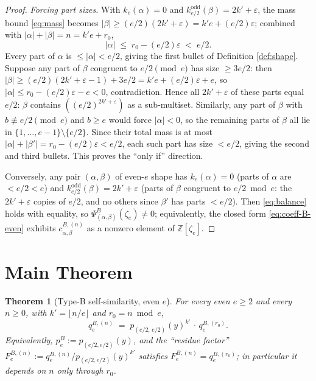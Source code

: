 \documentclass[11pt]{article}
\newtheorem{theorem}{Theorem}
\theoremstyle{definition}
\theoremstyle{remark}
\newcommand{\zetae}{\zeta_e}
\newcommand{\ZZ}{\mathbb{Z}}
\newcommand{\PsiB}{\Psi^{B}}
\newcommand{\peB}{p_e^{B}}
\newcommand{\eps}{\varepsilon}
\begin{document}
\begin{proof}
\emph{Forcing part sizes.} With $k_e(\alpha) = 0$ and $k_{e/2}^{\mathrm{odd}}(\beta) = 2k' + \eps$, the mass bound \eqref{eq:mass} becomes $|\beta| \ge (e/2)(2k' + \eps) = k'e + (e/2)\eps$; combined with $|\alpha| + |\beta| = n = k'e + r_0$,
\begin{equation}\label{eq:alpha-mass}
  |\alpha| \;\le\; r_0 - (e/2)\eps \;<\; e/2.
\end{equation}
Every part of $\alpha$ is $\le |\alpha| < e/2$, giving the first bullet of Definition \ref{def:shape}. Suppose any part of $\beta$ congruent to $e/2 \pmod e$ has size $\ge 3e/2$: then $|\beta| \ge (e/2)(2k' + \eps - 1) + 3e/2 = k'e + (e/2)\eps + e$, so $|\alpha| \le r_0 - (e/2)\eps - e < 0$, contradiction. Hence all $2k' + \eps$ of these parts equal $e/2$: $\beta$ contains $((e/2)^{2k' + \eps})$ as a sub-multiset. Similarly, any part of $\beta$ with $b \not\equiv e/2 \pmod{e}$ and $b \ge e$ would force $|\alpha| < 0$, so the remaining parts of $\beta$ all lie in $\{1, \ldots, e-1\} \setminus \{e/2\}$. Since their total mass is at most $|\alpha| + |\beta'| = r_0 - (e/2)\eps < e/2$, each such part has size $< e/2$, giving the second and third bullets. This proves the ``only if'' direction.

Conversely, any pair $(\alpha, \beta)$ of even-$e$ shape has $k_e(\alpha) = 0$ (parts of $\alpha$ are $< e/2 < e$) and $k_{e/2}^{\mathrm{odd}}(\beta) = 2k' + \eps$ (parts of $\beta$ congruent to $e/2 \bmod e$: the $2k' + \eps$ copies of $e/2$, and no others since $\beta'$ has parts $< e/2$). Then \eqref{eq:balance} holds with equality, so $\PsiB_{(\alpha,\beta)}(\zetae) \ne 0$; equivalently, the closed form \eqref{eq:coeff-B-even} exhibits $c^{B,(n)}_{\alpha,\beta}$ as a nonzero element of $\ZZ[\zetae]$.
\end{proof}

\section{Main Theorem}\label{sec:main}

\begin{theorem}[Type-B self-similarity, even $e$]\label{thm:main}
For every even $e \ge 2$ and every $n \ge 0$, with $k' = \lfloor n/e\rfloor$ and $r_0 = n \bmod e$,
\[
  q_e^{B, (n)} \;=\; p_{(e/2,\, e/2)}(y)^{k'}\, \cdot\, q_e^{B, (r_0)}.
\]
Equivalently, $\peB := p_{(e/2, e/2)}(y)$, and the ``residue factor'' $F_e^{B, (n)} := q_e^{B, (n)}/p_{(e/2, e/2)}(y)^{k'}$ satisfies $F_e^{B, (n)} = q_e^{B, (r_0)}$; in particular it depends on $n$ only through $r_0$.
\end{theorem}
\end{document}
